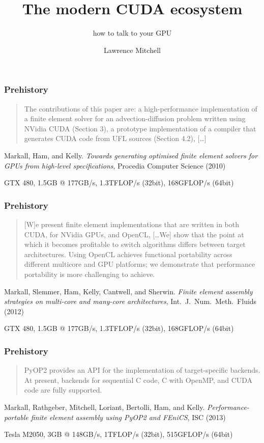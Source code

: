 \documentclass[aspectratio=169]{beamer}
\title{The modern CUDA ecosystem}
\subtitle{how to talk to your GPU}
\author{Lawrence Mitchell}
\institute{\texttt{lmitchell@nvidia.com}}
\begin{document}
\maketitle

\begin{frame}
  \frametitle{Prehistory}
  \begin{quote}
    The contributions of this paper are: a high-performance
    implementation of a finite element solver for an
    advection-diffusion problem written using NVidia CUDA (Section 3),
    a prototype implementation of a compiler that generates CUDA code
    from UFL sources (Section 4.2), [\dots]
  \end{quote}
  \pause
  {
    \scriptsize
    \raggedleft
    Markall, Ham, and Kelly.
    \emph{Towards generating optimised finite
      element solvers for GPUs from high-level specifications},
    Procedia Computer Science (2010) \nocite{Markall:2010}
    \par
    GTX 480, 1.5GB @ 177GB/s, 1.3TFLOP/s (32bit), 168GFLOP/s (64bit)
    \par
  }
\end{frame}
\begin{frame}
  \frametitle{Prehistory}
  \begin{quote}
    [W]e present finite element implementations that are
    written in both CUDA, for NVidia GPUs, and OpenCL, [\dots We] show
    that the point at which it becomes profitable to switch algorithms
    differs between target architectures. Using OpenCL achieves
    functional portability across different multicore and GPU
    platforms; we demonstrate that performance portability is more
    challenging to achieve.
  \end{quote}
  \pause
  {
    \scriptsize
    \raggedleft
    Markall, Slemmer, Ham, Kelly, Cantwell, and Sherwin.
    \emph{Finite element assembly strategies on multi-core and many-core architectures},
    Int.~J.~Num.~Meth.~Fluids (2012) \nocite{Markall:2013a}
    \par
    \vspace{\baselineskip}
    GTX 480, 1.5GB @ 177GB/s, 1.3TFLOP/s (32bit), 168GFLOP/s (64bit)
    \par
  }
\end{frame}

\begin{frame}
  \frametitle{\textcolor{black!40}{Pre}history}
  \begin{quote}
    PyOP2 provides an API for the implementation of target-specific
    backends. At present, backends for sequential C code, C with
    OpenMP, and CUDA code are fully supported.
  \end{quote}
  \pause
  {
    \scriptsize
    \raggedleft
    Markall, Rathgeber, Mitchell, Loriant, Bertolli, Ham, and Kelly.
    \emph{Performance-portable finite element assembly using PyOP2 and FEniCS},
    ISC (2013) \nocite{Markall:2013}
    \par
    Tesla M2050, 3GB @ 148GB/s, 1TFLOP/s (32bit), 515GFLOP/s (64bit)
    \par
  }
\end{frame}
\end{document}
